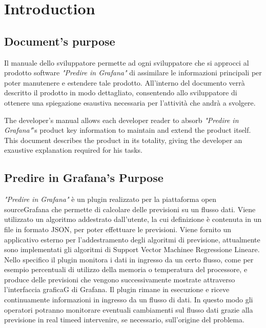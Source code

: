 \section{Introduction}
	\subsection{Document's purpose}
	Il manuale dello sviluppatore permette ad ogni sviluppatore che si approcci al prodotto software \emph{"Predire in Grafana"} di assimilare le informazioni principali per poter manutenere e estendere tale prodotto. All'interno del documento verrà descritto il prodotto in modo dettagliato, consentendo allo sviluppatore di ottenere una spiegazione esaustiva necessaria per l'attività che andrà a svolgere.

The developer's manual allows each developer reader to absorb \emph{"Predire in Grafana"}'s product key information to maintain and extend the product itself.
This document describes the product in its totality, giving the developer an exaustive explanation required for his tasks.
	
\subsection{Predire in Grafana’s Purpose}

\emph{"Predire in Grafana"} è un plugin realizzato per la piattaforma open source\glo Grafana che permette di calcolare delle previsioni su un flusso dati. Viene utilizzato un algoritmo addestrato dall'utente, la cui definizione è contenuta in un file in formato JSON\glo, per poter effettuare le previsioni.  Viene fornito un applicativo esterno per l'addestramento degli algoritmi di previsione, attualmente sono implementati gli algoritmi di Support Vector Machine\glo e Regressione Lineare\glo . Nello specifico il plugin monitora i dati in ingresso da un certo flusso, come
per esempio percentuali di utilizzo della memoria o temperatura del processore, e produce delle previsioni che vengono successivamente mostrate attraverso l'interfaccia graficaG di Grafana. Il plugin rimane in esecuzione e riceve continuamente informazioni in ingresso da un flusso di dati. In questo modo gli operatori potranno monitorare eventuali cambiamenti sul flusso dati grazie alla previsione in real time\glo ed intervenire, se necessario, sull'origine del problema. 
 
